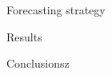 \documentclass[aspectratio=169, glossy]{beamer}
\begin{document}

\begin{frame}{Forecasting strategy}
 
\end{frame}


\begin{frame}{Results}

\end{frame}

\begin{frame}{Conclusionsz}
 
\end{frame}

\end{document}
